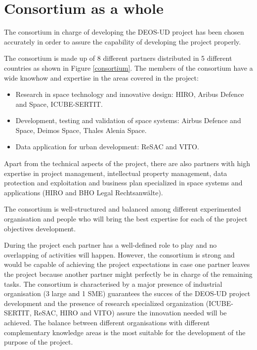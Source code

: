 \section{Consortium as a whole}
The consortium in charge of developing the DEOS-UD project has been chosen accurately in order to assure the capability of developing the project properly.

The consortium is made up of 8 different partners distributed in 5 different countries as shown in Figure \ref{consortium}. The members of the consortium have a wide knowhow and expertise in the areas covered in the project:

\begin{itemize}
\item Research in space technology and innovative design: HIRO, Aribus Defence and Space, ICUBE-SERTIT.
\item Development, testing and validation of space systems: Airbus Defence and Space, Deimos Space, Thales Alenia Space.
\item Data application for urban development: ReSAC and VITO.
\end{itemize} 

Apart from the technical aspects of the project, there are also partners with high expertise in project management, intellectual property management, data protection and exploitation and business plan specialized in space systems and applications (HIRO and BHO Legal Rechtsanwälte).

The consortium is well-structured and balanced among different experimented organisation and people who will bring the best expertise for each of the project objectives development.

During the project each partner has a well-defined role to play and no overlapping of activities will happen. However, the consortium is strong and would be capable of achieving the project expectations in case one partner leaves the project because another partner might perfectly be in charge of the remaining tasks. The consortium is characterised by a major presence of industrial organisation (3 large and 1 SME) guarantees the succes of the DEOS-UD project development and the presence of research specialized organization (ICUBE-SERTIT, ReSAC, HIRO and VITO) assure the innovation needed will be achieved. The balance between different organisations with different complementary knowledge areas is the most suitable for the development of the purpose of the project.

